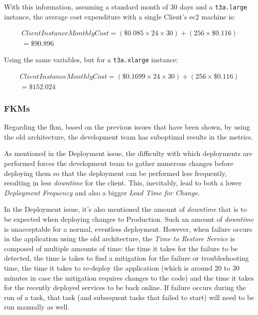 With this information, assuming a standard month of 30 days and a \texttt{t3a.large} instance, the average cost expenditure with a single Client's \gls{ec2} machine is:

\begin{align}
    \label{eq:ec2-instance-cost-t3alarge}
    Client Instance Monthly Cost = (\$0.085 \times 24 \times  30) + (256 \times  \$0.116)\\
    = \$90.896 \nonumber
    \end{align}

Using the same variables, but for a \texttt{t3a.xlarge} instance:

\begin{align}
    \label{eq:ec2-instance-cost-t3axlarge}
    Client Instance Monthly Cost = (\$0.1699 \times 24 \times  30) + (256 \times  \$0.116)\\
    = \$152.024 \nonumber
\end{align}



\subsubsection{FKMs}\label{methodology:sss:fkms}

Regarding the \gls{fkm}, based on the previous issues that have been shown, by using the old architecture, the development team has suboptimal results in the metrics.

As mentioned in the Deployment issue, the difficulty with which deployments are performed forces the development team to gather numerous changes before deploying them so that the deployment can be performed less frequently, resulting in less \textit{downtime} for the client. This, inevitably, lead to both a lower \textit{Deployment Frequency} and also a bigger \textit{Lead Time for Change}.

In the Deployment issue, it's also mentioned the amount of \textit{downtime} that is to be expected when deploying changes to Production. Such an amount of \textit{downtime} is unacceptable for a normal, eventless deployment. However, when failure occurs in the application using the old architecture, the \textit{Time to Restore Service} is composed of multiple amounts of time: the time it takes for the failure to be detected, the time is takes to find a mitigation for the failure or troubleshooting time, the time it takes to re-deploy the application (which is around 20 to 30 minutes in case the mitigation requires changes to the code) and the time it takes for the recently deployed services to be back online. If failure occurs during the run of a task, that task (and subsequent tasks that failed to start) will need to be run manually as well. 

